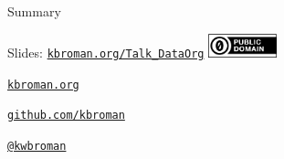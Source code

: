 \documentclass[aspectratio=169,12pt,t]{beamer}
\begin{document}
\begin{frame}[c]{Summary}



  \note{

  }

\end{frame}






\begin{frame}[c]{}

\Large

Slides: \href{https://kbroman.org/Talk_DataOrg}{\tt kbroman.org/Talk\_DataOrg}
\hfill \includegraphics[height=7mm]{Figs/cc-zero.png}

\vspace{7mm}

\href{https://kbroman.org}{\tt \lolit kbroman.org}

\vspace{7mm}

\href{https://github.com/kbroman}{\tt \lolit github.com/kbroman}

\vspace{7mm}

\href{https://twitter.com/kwbroman}{\tt \lolit @kwbroman}



\end{frame}
\end{document}
